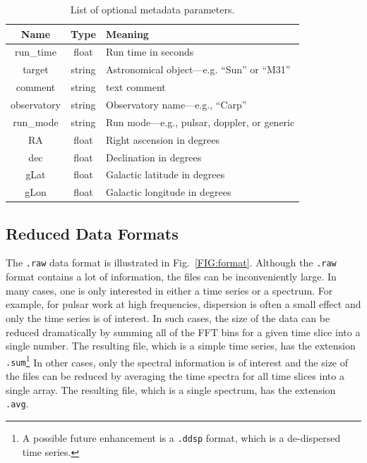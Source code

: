 \documentclass[12pt]{article}
\begin{document}
  \begin{table}[htbp] 
 \caption{List of optional metadata parameters.}
 \label{TAB2}
 \begin{center}
 \begin{tabular}{| c | c|  l |}
 \hline 
 Name & Type & Meaning \\
 \hline  \hline
run\_time & float & Run time in seconds \\
target      & string   & Astronomical object---e.g. ``Sun'' or ``M31''  \\
comment & string & text comment \\
observatory & string & Observatory name---e.g., ``Carp'' \\
run\_mode & string & Run mode---e.g., pulsar, doppler, or generic \\
RA & float & Right ascension in degrees \\
dec & float & Declination in degrees \\
gLat & float & Galactic latitude in degrees \\
gLon & float & Galactic longitude in degrees \\

\hline
\end{tabular}
\end{center}
\end{table}
 

\subsection{Reduced Data Formats}

The {\tt .raw} data format is illustrated in Fig.~\ref{FIG:format}.    Although the {\tt .raw} format contains a lot of information, the files can be inconveniently large.   In many cases, one is only interested in either a time series or a spectrum.    For example, for pulsar work at high frequencies, dispersion is often a small effect and only the time series is of interest.   In such cases, the size of the data can be reduced dramatically by summing all of the FFT bins for a given time slice into a single number.   The resulting   file, which is a simple time series,  has the extension {\tt .sum}\footnote{A possible future enhancement is a {\tt .ddsp} format, which is a de-dispersed time series.}   In other cases, only the spectral information is of interest and the size of the files can be reduced by averaging the time spectra for all time slices into a single array.    The resulting file, which is a single spectrum,  has the extension {\tt .avg}.  
\end{document}
